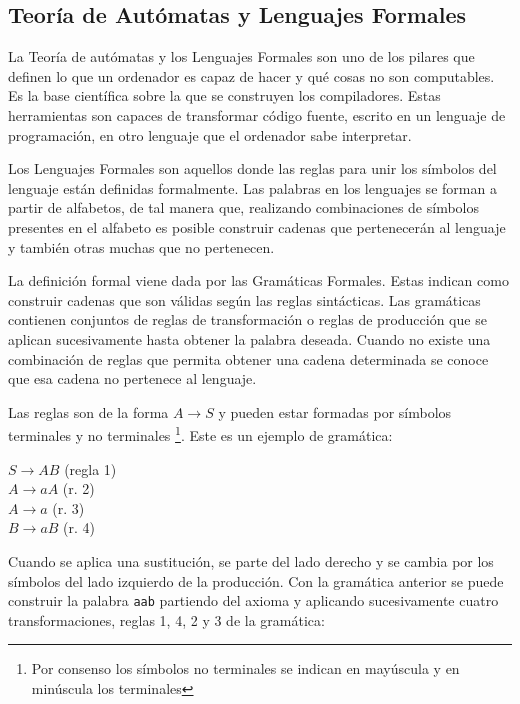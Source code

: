 \subsection{Teoría de Autómatas y Lenguajes Formales}

La Teoría de autómatas y los Lenguajes Formales son uno de los pilares que definen lo que un ordenador es capaz de hacer y qué cosas no son computables. Es la base científica sobre la que se construyen los compiladores. Estas herramientas son capaces de transformar código fuente, escrito en un lenguaje de programación, en otro lenguaje que el ordenador sabe interpretar.


Los Lenguajes Formales son aquellos donde las reglas para unir los símbolos del lenguaje están definidas formalmente. Las palabras en los lenguajes se forman a partir de alfabetos, de tal manera que, realizando combinaciones de símbolos presentes en el alfabeto es posible construir cadenas que pertenecerán al lenguaje y también otras muchas que no pertenecen. 


La definición formal viene dada por las Gramáticas Formales. Estas indican como construir cadenas que son válidas según las reglas sintácticas. Las gramáticas contienen conjuntos de reglas de transformación o reglas de producción que se aplican sucesivamente hasta obtener la palabra deseada. Cuando no existe una combinación de reglas que permita obtener una cadena determinada se conoce que esa cadena no pertenece al lenguaje.

Las reglas son de la forma $A\rightarrow S$ y pueden estar formadas por símbolos terminales y no terminales \footnote{Por consenso los símbolos no terminales se indican en mayúscula y en minúscula los terminales}. Este es un ejemplo de gramática:
\begin{center}
$S\rightarrow AB$ (regla 1) \\
$A\rightarrow aA$ (r. 2) \\
$A\rightarrow a$ (r. 3) \\
$B\rightarrow aB$ (r. 4) \\
\end{center}

Cuando se aplica una sustitución, se parte del lado derecho y se cambia por los símbolos del lado izquierdo de la producción. Con la gramática anterior se puede construir la palabra \verb|aab| partiendo del axioma y aplicando sucesivamente cuatro transformaciones, reglas 1, 4, 2 y 3 de la gramática:

